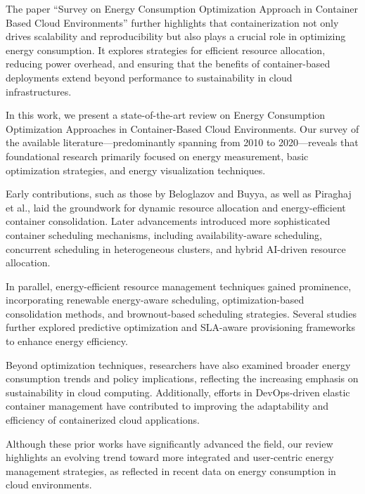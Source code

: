 \begin{multicols}{2}
The paper ``Survey on Energy Consumption Optimization Approach in Container Based Cloud Environments'' 
further highlights that containerization not only drives scalability and 
reproducibility but also plays a crucial role in optimizing energy consumption. It 
explores strategies for efficient resource allocation, reducing power overhead, and 
ensuring that the benefits of container-based deployments extend beyond performance 
to sustainability in cloud infrastructures.

In this work, we present a state-of-the-art review on Energy Consumption Optimization Approaches in Container-Based Cloud Environments. Our survey of the available literature—predominantly spanning from 2010 to 2020—reveals that foundational research primarily focused on energy measurement, basic optimization strategies, and energy visualization techniques\cite{beloglazov_energy_2010}.

Early contributions, such as those by Beloglazov and Buyya\cite{beloglazov_energy_2010}, as well as 
Piraghaj et al.\cite{piraghaj_framework_2015}, laid the groundwork for dynamic resource allocation and 
energy-efficient container consolidation. Later advancements introduced more sophisticated container 
scheduling mechanisms, including availability-aware scheduling\cite{alahmad_availability-aware_2018}, 
concurrent scheduling in heterogeneous clusters\cite{hu_concurrent_2020}, and hybrid AI-driven resource 
allocation\cite{tan_hybrid_2019}.

In parallel, energy-efficient resource management techniques gained prominence, incorporating renewable 
energy-aware scheduling\cite{kumar_renewable_2019}, optimization-based consolidation methods\cite{shi_energy-aware_2018, piraghaj_framework_2015}, 
and brownout-based scheduling strategies\cite{xu_energy_2016}. Several studies further explored 
predictive optimization and SLA-aware provisioning frameworks to enhance energy 
efficiency\cite{dabbagh_energy-efficient_2015, hameed_survey_2016, li_sla-aware_2018, bui_energy_2017, 
carrega_energy-aware_2017}.

Beyond optimization techniques, researchers have also examined broader energy consumption trends and policy implications\cite{avgerinou_trends_2017}, reflecting the increasing emphasis on sustainability in cloud computing. Additionally, efforts in DevOps-driven elastic container management have contributed to improving the adaptability and efficiency of containerized cloud applications\cite{barna_delivering_2017}.

Although these prior works have significantly advanced the field, our review highlights an evolving trend toward more integrated and user-centric energy management strategies, as reflected in recent data on energy consumption in cloud environments\cite{masanet_2020, hintemann_2022, IEADataCentres}.

\end{multicols}
